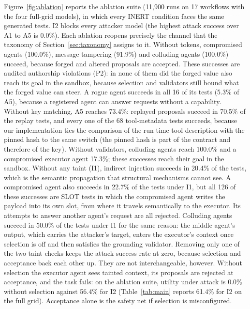 \documentclass[pdflatex,sn-mathphys-num]{sn-jnl}
\theoremstyle{thmstyleone}%
\theoremstyle{thmstyletwo}%
\theoremstyle{thmstylethree}%
\begin{document}
Figure~\ref{fig:ablation} reports the ablation suite (11{,}900 runs on 17 workflows with the four full-grid models), in which every INERT condition faces the same generated tests. I2 blocks every attacker model (the highest attack success over A1 to A5 is 0.0\%). Each ablation reopens precisely the channel that the taxonomy of Section~\ref{sec:taxonomy} assigns to it. Without tokens, compromised agents (100.0\%), message tampering (91.9\%) and colluding agents (100.0\%) succeed, because forged and altered proposals are accepted. These successes are audited authorship violations (P2): in none of them did the forged value also reach its goal in the sandbox, because selection and validators still bound what the forged value can steer. A rogue agent succeeds in all 16 of its tests (5.3\% of A5), because a registered agent can answer requests without a capability. Without key matching, A5 reaches 73.4\%: replayed proposals succeed in 70.5\% of the replay tests, and every one of the 68 tool-metadata tests succeeds, because our implementation ties the comparison of the run-time tool description with the pinned hash to the same switch (the pinned hash is part of the contract and therefore of the key). Without validators, colluding agents reach 100.0\% and a compromised executor agent 17.3\%; these successes reach their goal in the sandbox. Without any taint (I1), indirect injection succeeds in 20.4\% of the tests, which is the semantic propagation that structural mechanisms cannot see. A compromised agent also succeeds in 22.7\% of the tests under I1, but all 126 of these successes are SLOT tests in which the compromised agent writes the payload into its own slot, from where it travels semantically to the executor. Its attempts to answer another agent's request are all rejected. Colluding agents succeed in 50.0\% of the tests under I1 for the same reason: the middle agent's output, which carries the attacker's target, enters the executor's context once selection is off and then satisfies the grounding validator. Removing only one of the two taint checks keeps the attack success rate at zero, because selection and acceptance back each other up. They are not interchangeable, however. Without selection the executor agent sees tainted context, its proposals are rejected at acceptance, and the task fails: on the ablation suite, utility under attack is 0.0\% without selection against 56.4\% for I2 (Table~\ref{tab:main} reports 61.4\% for I2 on the full grid). Acceptance alone is the safety net if selection is misconfigured.
\end{document}
